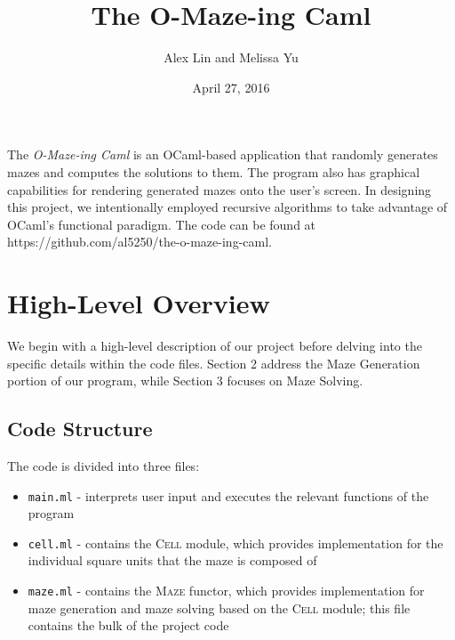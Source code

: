 \documentclass[11pt, margin=1in]{article}
\begin{document}
\title{The O-Maze-ing Caml}
\author{Alex Lin and Melissa Yu}
\date{April 27, 2016}
\maketitle

\setlength\parindent{0pt}

 
The \textit{O-Maze-ing Caml} is an OCaml-based application that randomly generates mazes and computes the solutions to them.  The program also has graphical capabilities for rendering generated mazes onto the user's screen.  In designing this project, we intentionally employed recursive algorithms to take advantage of OCaml's functional paradigm.  The code can be found at https://github.com/al5250/the-o-maze-ing-caml.  

\section{High-Level Overview}

We begin with a high-level description of our project before delving into the specific details within the code files.  Section 2 address the Maze Generation portion of our program, while Section 3 focuses on Maze Solving.  

\subsection{Code Structure}  %
The code is divided into three files:
\begin{itemize}
\item \texttt{main.ml} - interprets user input and executes the relevant functions of the program  
\item \texttt{cell.ml} - contains the \textsc{Cell} module, which provides implementation for the individual square units that the maze is composed of
\item \texttt{maze.ml} - contains the \textsc{Maze} functor, which provides implementation for maze generation and maze solving based on the \textsc{Cell} module; this file contains the bulk of the project code   
\end{itemize} 
\end{document}
